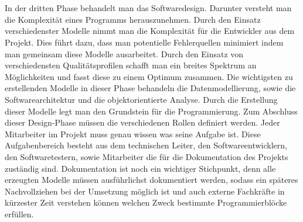 \documentclass{llncs}
\begin{document}
\\ \\
In der dritten Phase behandelt man das Softwaredesign. Darunter versteht man die Komplexität eines Programms herauszunehmen. Durch den Einsatz verschiedenster Modelle nimmt man die Komplexität für die Entwickler aus dem Projekt. Dies führt dazu, dass man potentielle Fehlerquellen minimiert indem man gemeinsam diese Modelle ausarbeitet. Durch den Einsatz von verschiedensten Qualitätsprofilen schafft man ein breites Spektrum an Möglichkeiten und fasst diese zu einem Optimum zusammen. Die wichtigsten zu erstellenden Modelle in dieser Phase behandeln die Datenmodellierung, sowie die Softwarearchitektur und die objektorientierte Analyse. Durch die Erstellung dieser Modelle legt man den Grundstein für die Programmierung. Zum Abschluss dieser Design-Phase müssen die verschiedenen Rollen definiert werden. Jeder Mitarbeiter im Projekt muss genau wissen was seine Aufgabe ist. Diese Aufgabenbereich besteht aus dem technischen Leiter, den Softwareentwicklern, den Softwaretestern, sowie Mitarbeiter die für die Dokumentation des Projekts zuständig sind. Dokumentation ist noch ein wichtiger Stichpunkt, denn alle erzeugten Modelle müssen ausführlichst dokumentiert werden, sodass ein späteres Nachvollziehen bei der Umsetzung möglich ist und auch externe Fachkräfte in kürzester Zeit verstehen können welchen Zweck bestimmte Programmierblöcke erfüllen.
\\ \\
\end{document}
